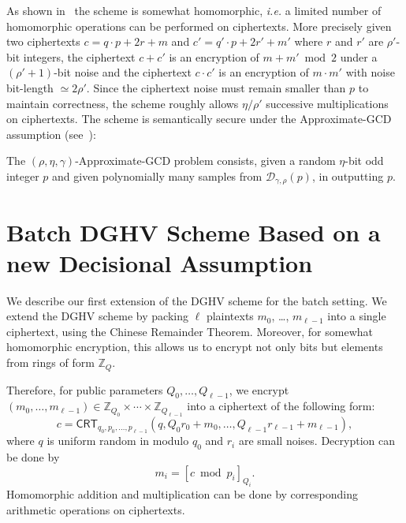 \documentclass{llncs}
\newcommand{\ie}{\textsl{i.e.}\xspace}
\newcommand{\Z}{{\mathbb Z}}
\newcommand*{\crt}{\ensuremath{\mathsf{CRT}}}
\begin{document}
As shown in~\cite{vDGHV2010} the scheme is somewhat homomorphic, \ie a
limited number of homomorphic operations can be performed on
ciphertexts. More precisely given two ciphertexts $c=q \cdot p+2r+m$
and $c'=q' \cdot p+2r'+m'$ where $r$ and $r'$ are $\rho'$-bit
integers, the ciphertext $c+c'$ is an encryption of
$m + m' \bmod 2$ under a $(\rho'+1)$-bit noise and the ciphertext $c \cdot
c'$ is an encryption of $m \cdot m'$ with noise bit-length $\simeq
2 \rho'$. Since the ciphertext noise must remain smaller than $p$ to maintain correctness, 
the scheme roughly allows $\eta/\rho'$ successive multiplications on ciphertexts.
The scheme is semantically secure under the Approximate-GCD assumption
(see~\cite{vDGHV2010}):

\begin{definition}
\label{def:approxGCD}
 The 
  $(\rho,\eta,\gamma)$-Approximate-GCD problem consists, given a random $ \eta $-bit odd integer $ p $ and
  given  polynomially many samples from $ \mathcal{D}_{\gamma,\rho}(p) $, in outputting $p$.
\end{definition}

\section{Batch DGHV Scheme Based on a new Decisional Assumption}\label{sec:batch-decisional}

%

We describe our first extension of the DGHV scheme for the batch setting.  We extend the DGHV scheme
by packing $\ell$ plaintexts $m_0$, \dots, $m_{\ell-1}$ into a single
ciphertext, using the Chinese Remainder
Theorem.  Moreover, for somewhat homomorphic encryption, this allows us to encrypt not only bits
but elements from rings of form $\Z_Q$.

Therefore, for public parameters $Q_0,\ldots,Q_{\ell-1}$, we encrypt
$(m_0, \dots, m_{\ell-1})\in\Z_{Q_0}\times\cdots\times\Z_{Q_{\ell-1}}$
into a ciphertext 
of the following form:
\[
c=\crt_{q_0,p_0,\ldots,p_{\ell-1}}(q, Q_0 r_0+m_0,\ldots,Q_{\ell-1}r_{\ell-1}+m_{\ell-1}),
\]
where $q$ is uniform random in modulo $q_0$ and $r_i$ are small noises.  Decryption can be done by
\[
m_i=[c\bmod{p_i}]_{Q_i}.
\]
Homomorphic addition and multiplication can be done by corresponding arithmetic operations on ciphertexts.
\end{document}
